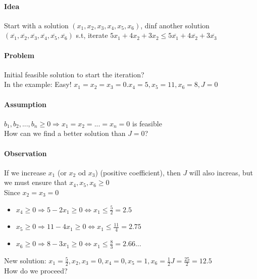\paragraph{Idea} Start with a solution $(x_1,x_2,x_3,x_4,x_5,x_6)$, dinf another solution $(\overline{x_1},\overline{x_2},\overline{x_3},\overline{x_4},\overline{x_5},\overline{x_6})$ s.t, iterate $5x_1+4x_2+3x_2 \leq 5\overline{x_1} + 4\overline{x_2} + 3\overline{x_3}$
\paragraph{Problem} Initial feasible solution to start the iteration? \\
In the example: Easy! $x_1=x_2=x_3=0.x_4=5,x_5=11,x_6=8,J=0$
\paragraph{Assumption} $b_1,b_2,...,b_n \geq 0 \Rightarrow x_1 = x_2 = ... = x_n = 0$ is feasible \\
How can we find a better solution than $J=0$?
\paragraph{Observation} If we increase $x_1$ (or $x_2$ od $x_3$) (positive coefficient), then $J$ will also increas, but we must ensure that $x_4,x_5,x_6 \geq 0$ \\
Since $x_2=x_3 = 0$
\begin{itemize}
	\item $x_4 \geq 0 \Rightarrow 5-2x_1 \geq 0 \Leftrightarrow x_1 \leq \frac{5}{2}= 2.5$
	\item $x_5 \geq 0 \Rightarrow 11-4x_1 \geq 0 \Leftrightarrow x_1 \leq \frac{11}{4} = 2.75$ 
	\item $x_6 \geq 0 \Rightarrow 8 -3x_1 \geq 0 \Leftrightarrow x_1 \leq \frac{8}{3}= 2.66...$
\end{itemize}
New solution: $x_1 = \frac{5}{2}, x_2,x_3 = 0, x_4 = 0, x_5 = 1, x_6 = \frac{1}{2} J = \frac{25}{2} = 12.5$ \\
How do we proceed? 
